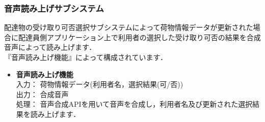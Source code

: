 \documentclass[a4j,titlepage]{jarticle}
\begin{document}
\subsubsection{音声読み上げサブシステム}
配達物の受け取り可否選択サブシステムによって荷物情報データが更新された場合に配達員側アプリケーション上で利用者の選択した受け取り可否の結果を合成音声によって読み上げます． \\
『音声読み上げ機能』によって構成されています．
\begin{itemize}
\item \textbf{音声読み上げ機能} \\
入力： 荷物情報データ(利用者名，選択結果(可/否)) \\
出力： 合成音声\\
処理： 音声合成APIを用いて音声を合成し，利用者名及び更新された選択結果を読み上げます．
\end{itemize}

\end{document}
